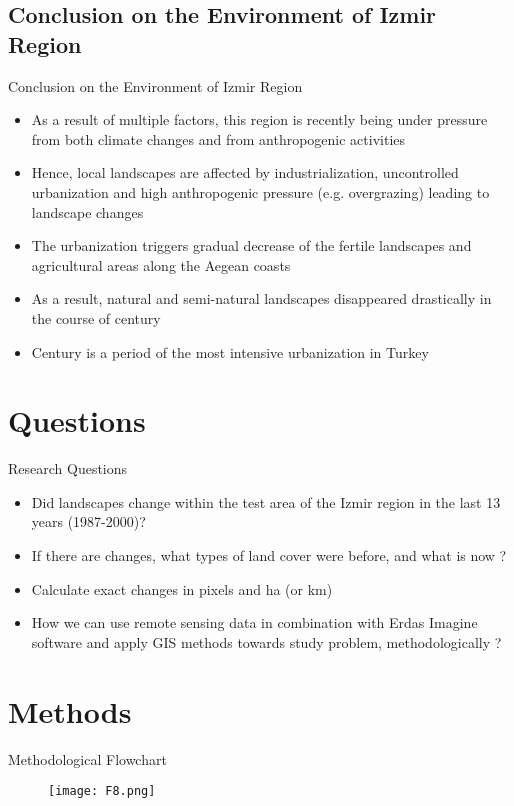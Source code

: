 \documentclass[pdflatex,compress,9pt,
	xcolor={dvipsnames,dvipsnames,svgnames,x11names,table},
	hyperref={colorlinks = true,breaklinks = true, urlcolor = NavyBlue, breaklinks = true}]{beamer}
\begin{document}
\subsection{Conclusion on the Environment of Izmir Region}
\begin{frame}{Conclusion on the Environment of Izmir Region}
\begin{itemize}
            \item As a result of multiple factors, this region is recently being under pressure from both climate changes and from anthropogenic activities
            \item Hence, local landscapes are affected by industrialization, uncontrolled urbanization and high anthropogenic pressure (e.g. overgrazing) leading to landscape changes
            \item The urbanization triggers gradual decrease of the fertile landscapes and agricultural areas along the Aegean coasts
            \item As a result, natural and semi-natural landscapes disappeared drastically in the course of  century
            \item {} Century is a period of the most intensive urbanization in Turkey
\end{itemize}
\end{frame}

\section{Questions}
\begin{frame}{Research Questions}
\begin{itemize}
            \item Did landscapes change within the test area of the Izmir region in the last 13 years (1987-2000)? 
            \item If there are changes, what types of land cover were before, and what is now ? 
            \item Calculate exact changes in pixels and ha (or km)
            \item How we can use remote sensing data in combination with Erdas Imagine software and apply GIS methods towards study problem, methodologically ?
\end{itemize}
\end{frame}

\section{Methods}
\begin{frame}{Methodological Flowchart}
\begin{figure}[H]
	\centering
		\texttt{[image: F8.png]}
\end{figure}
\end{frame}
\end{document}

